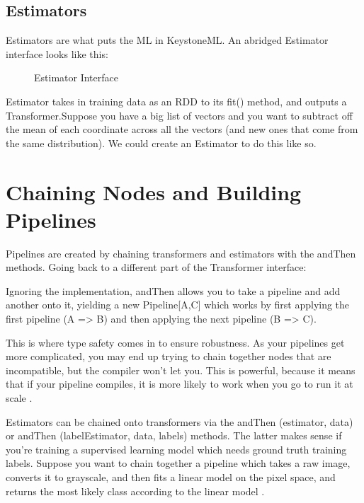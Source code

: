 \documentclass[9pt,twocolumn,twoside]{../../styles/osajnl}
\begin{document}
\subsection{Estimators}

Estimators are what puts the ML in KeystoneML. An abridged Estimator
interface looks like this:

\begin{figure}[htbp]
\centering
{}
\caption{Estimator Interface}
\label{fig:Estimator Interface}
\end{figure}

Estimator takes in training data as an RDD to its fit() method, and
outputs a Transformer.Suppose you have a big list of vectors and you
want to subtract off the mean of each coordinate across all the
vectors (and new ones that come from the same distribution). We could
create an Estimator to do this like so.

\section{Chaining Nodes and Building Pipelines}

Pipelines are created by chaining transformers and estimators with the
andThen methods. Going back to a different part of the Transformer
interface:

Ignoring the implementation, andThen allows you to take a pipeline and
add another onto it, yielding a new Pipeline[A,C] which works by first
applying the first pipeline (A => B) and then applying the next
pipeline (B => C).

This is where type safety comes in to ensure robustness. As your
pipelines get more complicated, you may end up trying to chain
together nodes that are incompatible, but the compiler won’t let
you. This is powerful, because it means that if your pipeline
compiles, it is more likely to work when you go to run it at scale \cite{www-keystoneml} .

Estimators can be chained onto transformers via the andThen
(estimator, data) or andThen (labelEstimator, data, labels)
methods. The latter makes sense if you’re training a supervised
learning model which needs ground truth training labels. Suppose you
want to chain together a pipeline which takes a raw image, converts it
to grayscale, and then fits a linear model on the pixel space, and
returns the most likely class according to the linear model \cite{www-keystoneml} .
\end{document}
